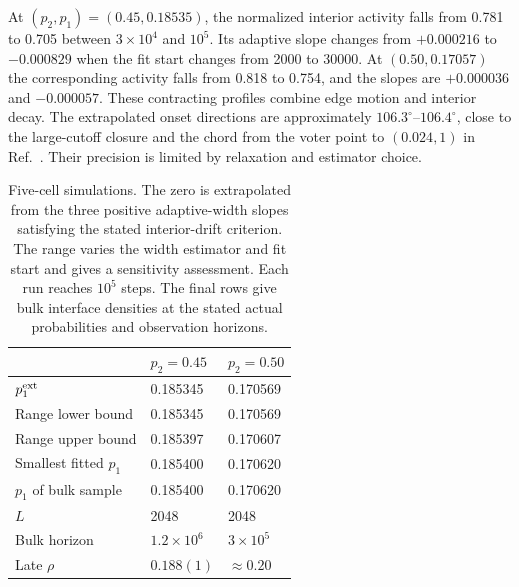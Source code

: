 At $(p_2,p_1)=(0.45,0.18535)$, the normalized interior activity falls
from 0.781 to 0.705 between $3\times10^4$ and $10^5$. Its adaptive slope
changes from $+0.000216$ to $-0.000829$ when the fit start changes from
2000 to 30000. At $(0.50,0.17057)$ the corresponding activity falls from
0.818 to 0.754, and the slopes are $+0.000036$ and $-0.000057$.
These contracting profiles combine edge motion and interior decay.
The extrapolated onset directions are approximately $106.3^\circ$--$106.4^\circ$,
close to the large-cutoff closure and the chord from the voter point to
$(0.024,1)$ in Ref.~\cite{molofsky1999}. Their precision is limited by
relaxation and estimator choice.

\begin{table}
\caption{Five-cell simulations. The zero is extrapolated from the three
positive adaptive-width slopes satisfying the stated interior-drift criterion.
The range varies the width estimator and fit start and gives a sensitivity
assessment. Each run reaches $10^5$ steps. The final rows give bulk interface
densities at the stated actual probabilities and observation horizons.}
\label{tab:molsim}
\begin{ruledtabular}
\begin{tabular}{lll}
 & $p_2=0.45$ & $p_2=0.50$\\
\hline
$p_1^{\rm ext}$ & 0.185345 & 0.170569\\
Range lower bound & 0.185345 & 0.170569\\
Range upper bound & 0.185397 & 0.170607\\
Smallest fitted $p_1$ & 0.185400 & 0.170620\\
$p_1$ of bulk sample & 0.185400 & 0.170620\\
$L$ & 2048 & 2048\\
Bulk horizon & $1.2\times10^6$ & $3\times10^5$\\
Late $\rho$ & $0.188(1)$ & $\approx0.20$\\
\end{tabular}
\end{ruledtabular}
\end{table}

